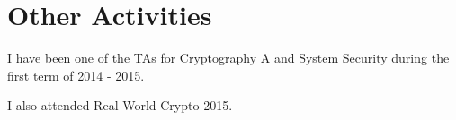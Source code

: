 \chapter{Other Activities}

I have been one of the TAs for Cryptography A and System Security during the first term of 2014 - 2015. 

I also attended Real World Crypto 2015.